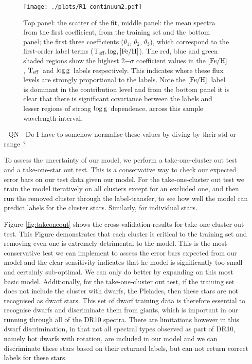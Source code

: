 \documentclass[12pt, preprint]{aastex}
\newcommand{\teff}{\mbox{$\rm T_{eff}$}}
\newcommand{\feh}{\mbox{$\rm [Fe/H]$}}
\newcommand{\logg}{\mbox{$\rm \log g$}}
\begin{document}
 
\begin{figure}[h!]
    \texttt{[image: ./plots/R1\_continuum2.pdf]}
  \caption{Top panel: the scatter of the fit, middle panel: the mean spectra from the first coefficient, from the training set and the bottom panel; the first three coefficients ($\theta_1$, $\theta_2$, $\theta_3$),  which correspond to the first-order label terms ($\teff, \log, \feh$).   The red, blue and green shaded regions show the highest 2$-\sigma$ coefficient values in the \feh, \teff\ and \logg\ labels respectively. This indicates where these flux levels are strongly proportional to the labels. Note the \feh\ label is dominant in the contribution level and from the bottom panel it is clear that there is significant covariance between the labels and lesser regions of strong \logg\ dependence, across this sample wavelength interval.}
\label{fig:coeffs}
\end{figure}
- QN  - Do I have to somehow normalise these values by diving by their std or range ? 


To assess the uncertainty of our model, we perform a take-one-cluster out test and a take-one-star out test. This is a conservative way to check our expected error bars on our test data given our model. For the take-one-cluster out test we train the model iteratively on all clusters except for an excluded one, and then run the removed cluster through the label-transfer, to see how well the model can predict labels for the cluster stars. Similarly, for individual stars.  

Figure \ref{fig:takeoneout} shows the cross-validation results for take-one-cluster out test. This Figure demonstrates that each cluster is critical to the training set and removing even one is extremely detrimental to the model. This is the most conservative test we can implement to assess the error bars expected from our model and the clear sensitivity indicates that he model is significantly too small and certainly sub-optimal. We can only do better by expanding on this most basic model. Additionally, for the take-one-cluster out test, if the training set does not include the cluster with dwarfs, the Pleiades, then these stars are not recognised as dwarf stars. This set of dwarf training data is therefore essential to recognise dwarfs and discriminate them from giants, which is important in our running through all of the DR10 spectra. There are limitations however in this dwarf discrimination, in that not all spectral types observed as part of DR10, namely hot dwarfs with rotation, are included in our model and we can discriminate these stars based on their returned labels, but can not return correct labels for these stars. 
\end{document}
